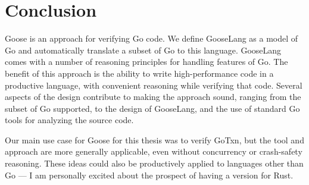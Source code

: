 \section{Conclusion}

Goose is an approach for verifying Go code. We define GooseLang as a model of Go
and automatically translate a subset of Go to this language. GooseLang comes
with a number of reasoning principles for handling features of Go. The benefit
of this approach is the ability to write high-performance code in a
productive language, with convenient reasoning while verifying
that code. Several aspects of the design contribute to making the approach
sound, ranging from the subset of Go supported, to the design of GooseLang, and
the use of standard Go tools for analyzing the source code.

Our main use case for Goose for this thesis was to verify GoTxn, but
the tool and approach are more generally applicable, even without concurrency or
crash-safety reasoning. These ideas could also be productively applied to
languages other than Go --- I am personally excited about the prospect of having
a version for Rust.
